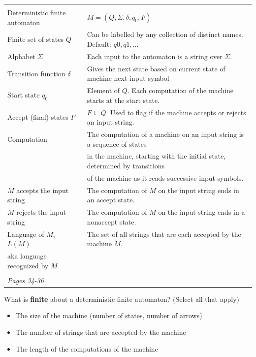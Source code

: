 \documentclass[12pt, oneside]{article}
\begin{document}
    \begin{center}
    \begin{tabular}{|ll|}
    \hline
    & \\
    Deterministic finite automaton & $M = (Q, \Sigma, \delta, q_0, F)$ \\
    Finite set of states $Q$  & Can  be labelled by any collection  of distinct names. Default: $q0, q1, \ldots$  \\
    Alphabet $\Sigma$ &   Each input to the automaton is a string over  $\Sigma$. \\
    Transition function $\delta$ &  Gives the next state based on current state of machine next input symbol\\
    Start state $q_0$ & Element of $Q$.  Each computation of the machine starts at the  start  state.\\
    Accept (final) states $F$ & $F \subseteq  Q$. Used to flag if the machine accepts or rejects
    an input string.\\
    Computation & The computation of a machine on an input string is a sequence of states \\
    &  in the machine,  starting with the initial state, determined by transitions \\
    & of the machine as it reads successive input symbols.
    \\
    $M$ accepts the input string & The computation of $M$ on the input string ends in an
    accept state.\\
    $M$ rejects the input string & The computation of $M$ on the input string ends in a
    nonaccept state.\\
    Language of $M$, $L(M)$ & The set of  all strings that  are each accepted by the machine $M$.\\
    aka language recognized by $M$ & \\
    & \\
    \hline
    {\it Pages 34-36}& \\
    \hline
    \end{tabular}
    \end{center}
    
    
    What is {\bf finite} about a deterministic finite automaton? (Select all that apply)
    \begin{itemize}
    \item The size of the machine (number of states, number of arrows)
    \item The number of strings that are accepted by the machine
    \item The length of the computations of the machine
    \end{itemize}
    
\end{document}
